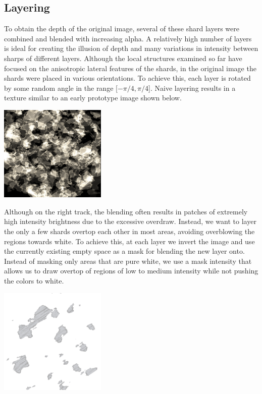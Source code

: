 \documentclass[a4paper, 11pt, titlepage]{article}
\begin{document}
\subsection{Layering}
To obtain the depth of the original image, several of these shard layers were
combined and blended with increasing alpha. A relatively high number of layers
is ideal for creating the illusion of depth and many variations in intensity
between sharps of different layers. Although the local structures examined so
far have focused on the anisotropic lateral features of the shards, in the
original image the shards were placed in various orientations. To achieve this,
each layer is rotated by some random angle in the range [$-\pi/4, \pi/4$].
Naive layering results in a texture similar to an early prototype image shown
below.

 {
    \includegraphics[width=2.0in]{images/spiky shards.png}
}

Although on the right track, the blending often results in patches of extremely
high intensity brightness due to the excessive overdraw. Instead, we want to
layer the only a few shards overtop each other in most areas, avoiding
overblowing the regions towards white. To achieve this, at each layer we invert
the image and use the currently existing empty space as a mask for blending the
new layer onto. Instead of masking only areas that are pure white, we use a mask
intensity that allows us to draw overtop of regions of low to medium intensity
while not pushing the colors to white.

 {
    \includegraphics[width=2.0in]{images/masked-shard-layer.png}
}
\end{document}
